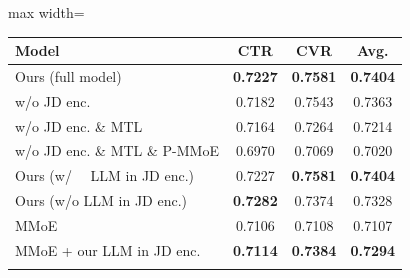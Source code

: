 \begin{table}
  \centering
  
  

  \begin{adjustbox}{max width=\columnwidth}
  \begin{tabular}{lccc}
    \Xhline{2\arrayrulewidth}
    Model                         & CTR             & CVR             & Avg.            \\
    \hline
    Ours (full model)             & \textbf{0.7227} & \textbf{0.7581} & \textbf{0.7404} \\
    w/o JD enc.                   & 0.7182          & 0.7543          & 0.7363          \\
    w/o JD enc. \& MTL            & 0.7164          & 0.7264          & 0.7214          \\
    w/o JD enc. \& MTL  \& P-MMoE & 0.6970          & 0.7069          & 0.7020          \\
    \hline
    Ours (w/~~ LLM in JD enc.)   & 0.7227          & \textbf{0.7581} & \textbf{0.7404} \\
    Ours (w/o LLM in JD enc.)     & \textbf{0.7282} & 0.7374          & 0.7328          \\
    \hline
    MMoE                          & 0.7106          & 0.7108          & 0.7107          \\
    MMoE + our LLM in JD enc.     & \textbf{0.7114} & \textbf{0.7384} & \textbf{0.7294} \\
    \Xhline{2\arrayrulewidth}
    \end{tabular}
  \end{adjustbox}
\end{table}